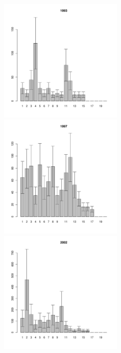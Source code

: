 \documentclass[12pt, a4paper]{article}
\begin{document}
\begin{figure}[h]
\begin{multicols}{3}
\hfill
\includegraphics[width=60mm]{../White_Sea/Luvenga_II_razrez/fucus_zone_1993_.pdf}
\hfill
\includegraphics[width=60mm]{../White_Sea/Luvenga_II_razrez/fucus_zone_1997_.pdf}
\hfill
\includegraphics[width=60mm]{../White_Sea/Luvenga_II_razrez/fucus_zone_2002_.pdf}
\end{multicols}



\end{figure}
\end{document}
